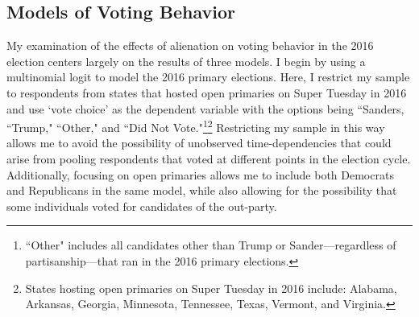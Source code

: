 \documentclass[12pt]{article}
\begin{document}

\subsection{Models of Voting Behavior}
My examination of the effects of alienation on voting behavior in the 2016 election centers largely on the results of three models. I begin by using a multinomial logit to model the 2016 primary elections. Here, I restrict my sample to respondents from states that hosted open primaries on Super Tuesday in 2016 and use `vote choice' as the dependent variable with the options being ``Sanders, ``Trump," ``Other," and ``Did Not Vote."\footnote{``Other" includes all candidates other than Trump or Sander---regardless of partisanship---that ran in the 2016 primary elections.}\footnote{States hosting open primaries on Super Tuesday in 2016 include: Alabama, Arkansas, Georgia, Minnesota, Tennessee, Texas, Vermont, and Virginia.} Restricting my sample in this way allows me to avoid the possibility of unobserved time-dependencies that could arise from pooling respondents that voted at different points in the election cycle. Additionally, focusing on open primaries allows me to include both Democrats and Republicans in the same model, while also allowing for the possibility that some individuals voted for candidates of the out-party.
\end{document}
